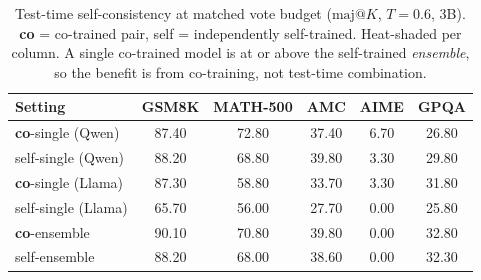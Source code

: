 \begin{table}[t]\centering\small
\setlength{\tabcolsep}{6pt}\renewcommand{\arraystretch}{1.12}
\begin{tabular}{l ccccc}
\toprule
Setting & GSM8K & MATH-500 & AMC & AIME & GPQA \\
\midrule
\textbf{co}-single (Qwen) & \cellcolor{heat!52}87.40 & \cellcolor{heat!58}72.80 & \cellcolor{heat!48}37.40 & \cellcolor{heat!58}6.70 & \cellcolor{heat!13}26.80 \\
self-single (Qwen) & \cellcolor{heat!54}88.20 & \cellcolor{heat!46}68.80 & \cellcolor{heat!58}39.80 & \cellcolor{heat!32}3.30 & \cellcolor{heat!36}29.80 \\
\textbf{co}-single (Llama) & \cellcolor{heat!52}87.30 & \cellcolor{heat!15}58.80 & \cellcolor{heat!32}33.70 & \cellcolor{heat!32}3.30 & \cellcolor{heat!51}31.80 \\
self-single (Llama) & \cellcolor{heat!6}65.70 & \cellcolor{heat!6}56.00 & \cellcolor{heat!6}27.70 & \cellcolor{heat!6}0.00 & \cellcolor{heat!6}25.80 \\
\textbf{co}-ensemble & \cellcolor{heat!58}90.10 & \cellcolor{heat!52}70.80 & \cellcolor{heat!58}39.80 & \cellcolor{heat!6}0.00 & \cellcolor{heat!58}32.80 \\
self-ensemble & \cellcolor{heat!54}88.20 & \cellcolor{heat!43}68.00 & \cellcolor{heat!53}38.60 & \cellcolor{heat!6}0.00 & \cellcolor{heat!54}32.30 \\
\bottomrule
\end{tabular}
\caption{Test-time self-consistency at matched vote budget ($\mathrm{maj}@K$, $T{=}0.6$, 3B). \textbf{co} = co-trained pair, self = independently self-trained. Heat-shaded per column. A single co-trained model is at or above the self-trained \emph{ensemble}, so the benefit is from co-training, not test-time combination.}
\label{tab:ensemble}
\end{table}